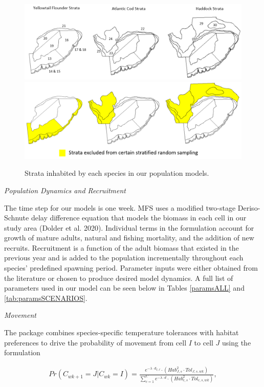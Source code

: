 \documentclass[
  12pt,
]{article}
\begin{document}
\begin{figure}

{\centering \includegraphics[width=0.95\linewidth]{Images/Strata2} \includegraphics[width=0.95\linewidth]{Images/Excluded_strata2} 

}

\caption{Strata inhabited by each species in our population models.}\label{fig:strata-plot}
\end{figure}

\emph{Population Dynamics and Recruitment}

The time step for our models is one week. MFS uses a modified two-stage Deriso-Schnute delay difference equation that models the biomass in each cell in our study area (Dolder et al. 2020). Individual terms in the formulation account for growth of mature adults, natural and fishing mortality, and the addition of new recruits. Recruitment is a function of the adult biomass that existed in the previous year and is added to the population incrementally throughout each species' predefined spawning period. Parameter inputs were either obtained from the literature or chosen to produce desired model dynamics. A full list of parameters used in our model can be seen below in Tables \ref{paramsALL} and \ref{tab:paramsSCENARIOS}.

\emph{Movement}

The package combines species-specific temperature tolerances with habitat preferences to drive the probability of movement from cell \(I\) to cell \(J\) using the formulation

\begin{align}
Pr(C_{wk+1}=J|C_{wk}=I) = \frac{e^{-\lambda \cdot d_{I,J}}\cdot(Hab^2_{J,s} \cdot Tol_{J,s,wk})}{\sum^C_{c=1}e^{-\lambda \cdot d} \cdot (Hab^2_{c,s} \cdot Tol_{c,s,wk})},
\label{moveP}
\end{align}
\end{document}
